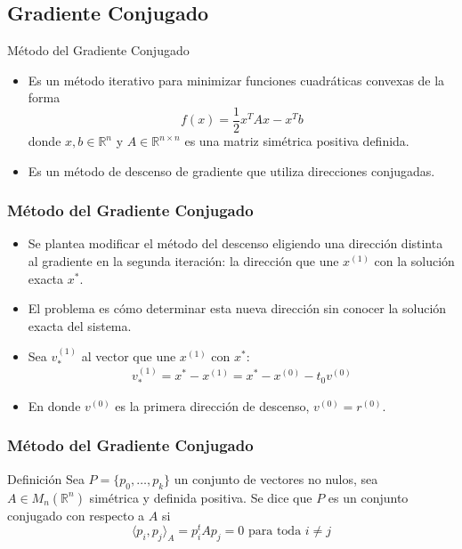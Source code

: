\documentclass[10pt]{beamer}
\begin{document}
\subsection{Gradiente Conjugado}
\begin{frame}{M\'etodo del Gradiente Conjugado}
  \begin{itemize}
   \item Es un m\'etodo iterativo para minimizar funciones cuadr\'aticas convexas de la forma
   $$
   f(x) = \dfrac{1}{2}x^{T}Ax-x^{T}b
   $$
   donde $x,b \in \mathbb{R}^{n}$ y $A \in \mathbb{R}^{n \times n}$ es una matriz sim\'etrica positiva definida.
   \item<2-> Es un m\'etodo de descenso de gradiente que utiliza direcciones conjugadas.
  \end{itemize}
 \end{frame}
 \begin{frame}
  \frametitle{M\'etodo del Gradiente Conjugado}  
  \begin{itemize}
   \item<1-> Se plantea modificar el m\'etodo del descenso eligiendo una direcci\'on distinta al gradiente en la segunda iteraci\'on: la direcci\'on que une $x^{(1)}$ con la
   soluci\'on exacta $x^*$.
   \item<2->El problema es c\'omo determinar esta nueva direcci\'on sin conocer la soluci\'on exacta del sistema.
   \item<3->Sea $v_*^{(1)}$ al vector que une $x^{(1)}$ con $x^*$:   
   $$
   v_*^{(1)} = x^* - x^{(1)} = x^* - x^{(0)} - t_0v^{(0)}
   $$
   \item<4->En donde $v^{(0)}$ es la primera direcci\'on de descenso, $v^{(0)} = r^{(0)}$.
  \end{itemize}
\end{frame}
\begin{frame}
\frametitle{M\'etodo del Gradiente Conjugado}
\begin{block}{Definici\'on}
  Sea $P = \{p_0 , \ldots , p_k \}$ un conjunto de vectores no nulos, sea $A \in M_n(\mathbb{R}^n)$ sim\'etrica y definida positiva. Se dice que $P$ es un conjunto conjugado con respecto a $A$ si
  $$
  \langle p_i, p_j\rangle_A = p^t_i Ap_j = 0
  \text{ para toda } i \neq j
  $$
\end{block}
\end{frame}
\end{document}
